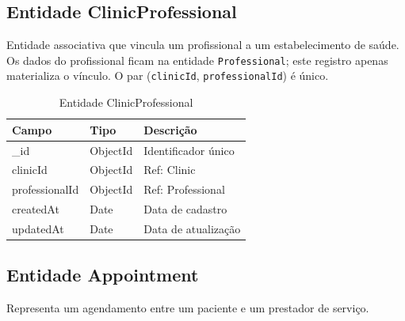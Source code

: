 \subsection{Entidade ClinicProfessional}
\label{subsec:entity-clinic-professional}

Entidade associativa que vincula um profissional a
um estabelecimento de saúde. Os dados do profissional
ficam na entidade \texttt{Professional}; este registro
apenas materializa o vínculo. O par
(\texttt{clinicId}, \texttt{professionalId}) é único.

\begin{table}[H]
  \centering
  \caption{Entidade ClinicProfessional}
  \label{tab:entity-clinic-professional}
  \begin{tabular}{p{3.8cm}p{2.5cm}p{5.2cm}}
    \toprule
    \textbf{Campo} &
    \textbf{Tipo} &
    \textbf{Descrição} \\
    \midrule
    \_id            & ObjectId & Identificador único \\
    clinicId        & ObjectId & Ref: Clinic \\
    professionalId  & ObjectId & Ref: Professional \\
    createdAt       & Date     & Data de cadastro \\
    updatedAt       & Date     & Data de atualização \\
    \bottomrule
  \end{tabular}
\end{table}

\subsection{Entidade Appointment}
\label{subsec:entity-appointment}

Representa um agendamento entre um paciente e um
prestador de serviço.

